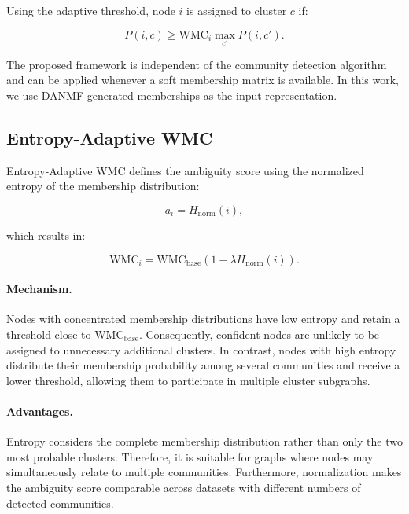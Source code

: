 \documentclass[a4paper,11pt,oneside,onecolumn,preprint]{elsarticle}
\numberwithin{equation}{section}
\begin{document}
Using the adaptive threshold, node $i$ is assigned to cluster $c$ if:

\begin{equation}
P(i,c)\geq
\mathrm{WMC}_i
\max_{c'}P(i,c').
\label{eq:selection-rule}
\end{equation}

The proposed framework is independent of the community detection algorithm and can be applied whenever a soft membership matrix is available.
In this work, we use DANMF-generated memberships as the input representation.


\subsection{Entropy-Adaptive WMC}
\label{subsec:entropy-adaptive}

Entropy-Adaptive WMC defines the ambiguity score using the normalized entropy of the membership distribution:

\begin{equation}
a_i = H_{\mathrm{norm}}(i),
\label{eq:entropy-score}
\end{equation}

which results in:

\begin{equation}
\mathrm{WMC}_i =
\mathrm{WMC}_{\mathrm{base}}
(1-\lambda H_{\mathrm{norm}}(i)).
\label{eq:entropy-adaptive}
\end{equation}

\paragraph{Mechanism.}

Nodes with concentrated membership distributions have low entropy and retain a threshold close to $\mathrm{WMC}_{\mathrm{base}}$.
Consequently, confident nodes are unlikely to be assigned to unnecessary additional clusters.
In contrast, nodes with high entropy distribute their membership probability among several communities and receive a lower threshold, allowing them to participate in multiple cluster subgraphs.

\paragraph{Advantages.}

Entropy considers the complete membership distribution rather than only the two most probable clusters.
Therefore, it is suitable for graphs where nodes may simultaneously relate to multiple communities.
Furthermore, normalization makes the ambiguity score comparable across datasets with different numbers of detected communities.
\end{document}
